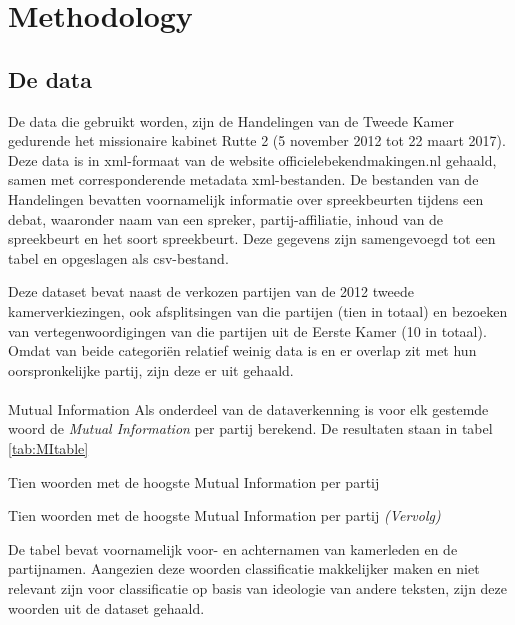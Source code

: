 \section{Methodology}
\label{sec:meth}


\subsection{De data}
De data die gebruikt worden, zijn de Handelingen van de Tweede Kamer gedurende het missionaire kabinet Rutte 2 (5 november 2012 tot 22 maart 2017). Deze data is in xml-formaat van de website officielebekendmakingen.nl gehaald, samen met corresponderende metadata xml-bestanden. De bestanden van de Handelingen bevatten voornamelijk informatie over spreekbeurten tijdens een debat, waaronder naam van een spreker, partij-affiliatie, inhoud van de spreekbeurt en het soort spreekbeurt. Deze gegevens zijn samengevoegd tot een tabel en opgeslagen als csv-bestand.\par
Deze dataset bevat naast de verkozen partijen van de 2012 tweede kamerverkiezingen, ook afsplitsingen van die partijen (tien in totaal) en bezoeken van vertegenwoordigingen van die partijen uit de Eerste Kamer (10 in totaal). Omdat van beide categori\"{e}n relatief weinig data is en er overlap zit met hun oorspronkelijke partij, zijn deze er uit gehaald.
\begin{table}[H]
\centering

\end{table}

\paragraph{}{Mutual Information}
Als onderdeel van de dataverkenning is voor elk gestemde woord de \textit{Mutual Information} per partij berekend. De resultaten staan in tabel \ref{tab:MItable}
\begin{table}[H]
\caption{Tien woorden met de hoogste Mutual Information per partij}
\label{tab:MItable}
\centering

\end{table}
\addtocounter{table}{-1}
\begin{table}[H]
\caption{Tien woorden met de hoogste Mutual Information per partij \emph{(Vervolg)}}
\centering

\end{table}

De tabel bevat voornamelijk voor- en achternamen van kamerleden en de partijnamen. Aangezien deze woorden classificatie makkelijker maken en niet relevant zijn voor classificatie op basis van ideologie van andere teksten, zijn deze woorden uit de dataset gehaald.
\pagebreak
